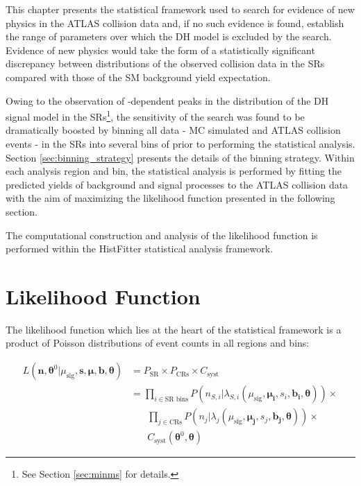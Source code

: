 \label{chapter:stat}

This chapter presents the statistical framework used to search for evidence of new physics in the ATLAS collision data and, if no such evidence is found, establish the range of parameters over which the DH model is excluded by the search. Evidence of new physics would take the form of a statistically significant discrepancy between distributions of the observed collision data in the SRs compared with those of the SM background yield expectation.

Owing to the observation of \ms-dependent peaks in the \minms distribution of the DH signal model in the SRs\footnote{See Section \ref{sec:minms} for details.}, the sensitivity of the search was found to be dramatically boosted by binning all data - MC simulated and ATLAS collision events - in the SRs into several bins of \minms prior to performing the statistical analysis. Section \ref{sec:binning_strategy} presents the details of the binning strategy. Within each analysis region and bin, the statistical analysis is performed by fitting the predicted yields of background and signal processes to the ATLAS collision data with the aim of maximizing the likelihood function presented in the following section. 

The computational construction and analysis of the likelihood function is performed within the HistFitter \cite{Baak_2015} statistical analysis framework.

\section{Likelihood Function}
\label{sec:likelihood}

The likelihood function which lies at the heart of the statistical framework is a product of Poisson distributions of event counts in all regions and bins:

\begin{equation}
\label{eq:likelihood_func}
\begin{aligned}
L(\boldsymbol{n}, \boldsymbol{\theta}^0|\mu_\text{sig}, \boldsymbol{s}, \boldsymbol{\mu}, \boldsymbol{b}, \boldsymbol{\theta}) & = P_\text{SR} \times P_\text{CRs} \times C_\text{syst} \\
& = \prod_{i\in\text{SR bins}} P(n_{S,i}|\lambda_{S,i}(\mu_\text{sig}, \boldsymbol{\mu_i}, s_i, \boldsymbol{b_i}, \boldsymbol{\theta})) \times \\ 
&\phantom{xxx}\prod_{j \in \text{CRs}} P(n_j|\lambda_j(\mu_\text{sig}, \boldsymbol{\mu_j}, s_j, \boldsymbol{b_j}, \boldsymbol{\theta})) \times \\
&\phantom{xxx}C_\text{syst}(\boldsymbol{\theta}^0, \boldsymbol{\theta})
\end{aligned}
\end{equation}

